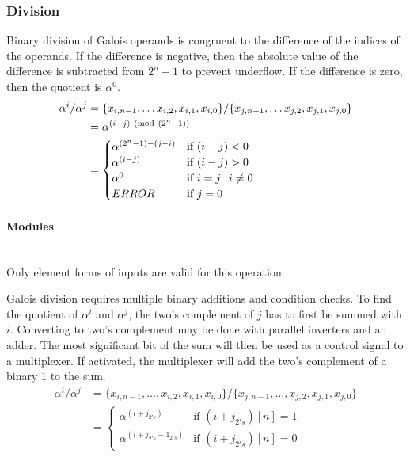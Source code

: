 \subsubsection{Division} Binary division of Galois operands is congruent to the
difference of the indices of the operands. If the difference is negative, then
the absolute value of the difference is subtracted from $2^{n}-1$ to prevent
underflow. If the difference is zero, then the quotient is $\alpha^{0}$.
    \begin{align*}
        \alpha^{i} / \alpha^{j} & = \{x_{i, n-1},\ldots x_{i, 2},x_{i,
        1},x_{i, 0}\} / \{x_{j, n-1}, \ldots x_{j, 2}, x_{j, 1}, x_{j, 0}\}
        \\
        & = \alpha^{(i - j) \ (\mathrm{mod}\ (2^{n}-1))} \\
        & = \begin{cases}
            \alpha^{(2^{n}-1) - (j - i)} & \text{if $(i - j) < 0$} \\
            \alpha^{(i - j)} & \text{if $(i - j) > 0$} \\
            \alpha^{0} & \text{if $i = j, \ i \neq 0$} \\
            ERROR & \text{if $j = 0$}
        \end{cases}
    \end{align*}

    \paragraph{{\small Modules}} \leavevmode \\ Only element forms of inputs
    are valid for this operation.

    Galois division requires multiple binary additions and condition checks. To
    find the quotient of $\alpha^{i}$ and $\alpha^{j}$, the two's complement of
    $j$ has to first be summed with $i$. Converting to two's complement may be
    done with parallel inverters and an adder. The most significant bit of the
    sum will then be used as a control signal to a multiplexer. If activated,
    the multiplexer will add the two's complement of a binary $1$ to the sum.
\begin{align*}
    \alpha^{i} / \alpha^{j} & = \{ x_{i, n-1}, \ldots, x_{i, 2}, x_{i, 1},
    x_{i, 0} \} / \{x_{j, n-1}, \ldots, x_{j, 2}, x_{j, 1}, x_{j, 0}\} \\
    & = \begin{cases}
            \alpha^{(i + j_{2's})} & \text{if $(i+j_{2's})[n]=1$} \\
            \alpha^{(i + j_{2's} + 1_{2's})} & \text{if $(i+j_{2's})[n]=0$}
        \end{cases}
\end{align*}
